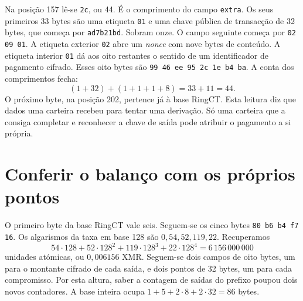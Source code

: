 Na posição 157 lê-se \texttt{2c}, ou 44. É o comprimento do campo
\texttt{extra}. Os seus primeiros 33 bytes são uma etiqueta
\texttt{01} e uma chave pública de transacção de 32 bytes, que começa
por \texttt{ad7b21bd}. Sobram onze. O campo seguinte começa por
\texttt{02 09 01}. A etiqueta exterior \texttt{02} abre um
\emph{nonce} com nove bytes de conteúdo. A etiqueta interior
\texttt{01} dá aos oito restantes o sentido de um identificador de
pagamento cifrado. Esses oito bytes são
\texttt{99 46 ee 95 2c 1e b4 ba}. A conta dos comprimentos fecha:
\[
             (1+32)+(1+1+1+8)=33+11=44.
\]
O próximo byte, na posição 202, pertence já à base RingCT.
Esta leitura diz que dados uma carteira recebeu para tentar uma
derivação. Só uma carteira que a consiga completar e reconhecer a
chave de saída pode atribuir o pagamento a si própria.

\section{Conferir o balanço com os próprios pontos}

O primeiro byte da base RingCT vale seis. Seguem-se os cinco bytes
\texttt{80 b6 b4 f7 16}. Os algarismos da taxa em base 128
são \(0,54,52,119,22\). Recuperamos
\[
  54\cdot128+52\cdot128^2+119\cdot128^3+22\cdot128^4
      =6\,156\,000\,000
\]
unidades atómicas, ou \(0{,}006156\) XMR. Seguem-se dois campos de
oito bytes, um para o montante cifrado de cada saída, e dois pontos
de 32 bytes, um para cada compromisso. Por esta altura, saber a
contagem de saídas do prefixo poupou dois novos contadores. A base
inteira ocupa \(1+5+2\cdot8+2\cdot32=86\) bytes.

